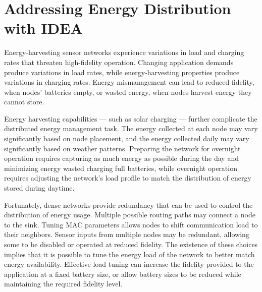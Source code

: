\chapter{Addressing Energy Distribution with IDEA}
\label{chapter-idea}

Energy-harvesting sensor networks experience variations in load and charging
rates that threaten high-fidelity operation. Changing application demands
produce variations in load rates, while energy-harvesting properties produce
variations in charging rates. Energy mismanagement can lead to reduced
fidelity, when nodes' batteries empty, or wasted energy, when nodes harvest
energy they cannot store.

Energy harvesting capabilities --- such as solar charging --- further
complicate the distributed energy management task. The energy collected at
each node may vary significantly based on node placement, and the energy
collected daily may vary significantly based on weather patterns. Preparing
the network for overnight operation requires capturing as much energy as
possible during the day and minimizing energy wasted charging full batteries,
while overnight operation requires adjusting the network's load profile to
match the distribution of energy stored during daytime.

Fortunately, dense networks provide redundancy that can be used to control
the distribution of energy usage. Multiple possible routing paths may connect
a node to the sink. Tuning MAC parameters allows nodes to shift communication
load to their neighbors. Sensor inputs from multiple nodes may be redundant,
allowing some to be disabled or operated at reduced fidelity. The existence
of these choices implies that it is possible to tune the energy load of the
network to better match energy availability. Effective load tuning can
increase the fidelity provided to the application at a fixed battery size, or
allow battery sizes to be reduced while maintaining the required fidelity
level.

